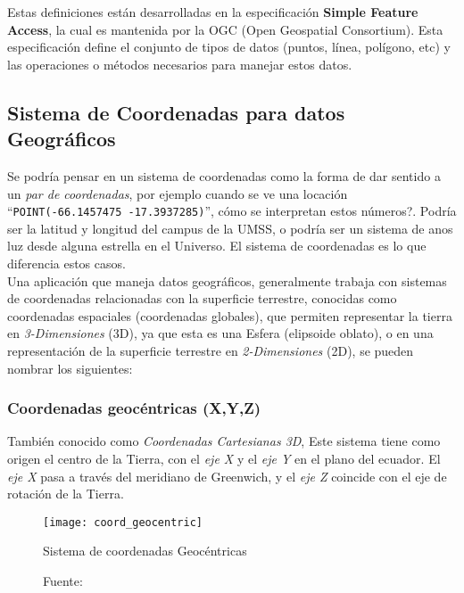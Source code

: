     Estas definiciones están desarrolladas en la especificación \textbf{Simple Feature Access}, la cual es mantenida por la OGC (Open Geospatial Consortium). Esta especificación define el conjunto de tipos de datos (puntos, línea, polígono, etc) y las operaciones o métodos necesarios para manejar estos datos.


  \subsection{Sistema de Coordenadas para datos Geográficos} %
  \label{sub:sistema_de_coordenadas_para_datos_geograficos}
    Se podría pensar en un sistema de coordenadas como la forma de dar sentido a un \emph{par de coordenadas}, por ejemplo cuando se ve una locación ``\verb|POINT(-66.1457475 -17.3937285)|'', cómo se interpretan estos números?.
    Podría ser la latitud y longitud del campus de la UMSS, o podría ser un sistema de anos luz desde alguna estrella en el Universo.
    El sistema de coordenadas es lo que diferencia estos casos.\\


    Una aplicación que maneja datos geográficos, generalmente trabaja con sistemas de coordenadas relacionadas con la superficie terrestre, conocidas como coordenadas espaciales (coordenadas globales), que permiten representar la tierra en \emph{3-Dimensiones} (3D), ya que esta es una Esfera (elipsoide oblato), o en una representación de la superficie terrestre en \emph{2-Dimensiones} (2D), se pueden nombrar los siguientes:

    \subsubsection{Coordenadas geocéntricas (X,Y,Z)} %
      \label{subs:coordenadas_geocentricas}
        También conocido como \emph{Coordenadas Cartesianas 3D}, Este sistema tiene como origen el centro de la Tierra, con el \emph{eje X} y el \emph{eje Y} en el plano del ecuador. El \emph{eje X} pasa a través del meridiano de Greenwich, y el \emph{eje Z}  coincide con el eje de rotación de la Tierra.

        \begin{figure}[H]
          \begin{center}
            \texttt{[image: coord\_geocentric]}
            \caption{Sistema de coordenadas Geocéntricas}
            \label{fig:coord_geocentric}
            \caption*{Fuente: \cite{coords2009} }
          \end{center}
        \end{figure}

